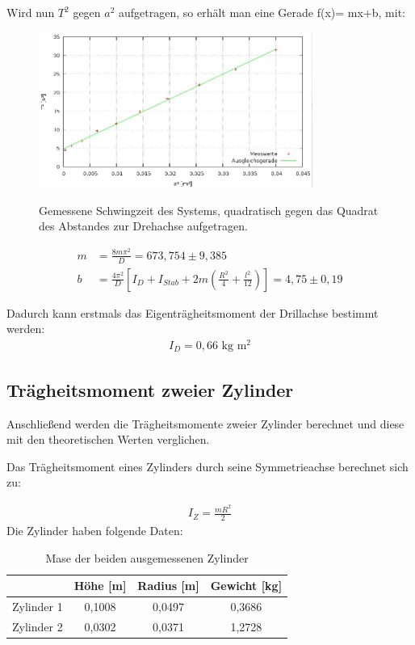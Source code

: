 Wird nun $T^2$ gegen $a^2$ aufgetragen, so erhält man eine Gerade f(x)= mx+b, mit:
\begin{figure}[htbp]
\includegraphics[width=0.8\textwidth]{pics/eigentr.jpg}
\label{pic_plot}
\caption{Gemessene Schwingzeit des Systems, quadratisch gegen das Quadrat des Abstandes zur Drehachse aufgetragen.}

\end{figure}
\begin{align*}
 m&=\frac{8m\pi^2}{D}=673,754 \pm 9,385\\
b&=\frac{4\pi^2}{D}  \left[  I_D+I_{Stab}+2m\left(\frac{R^2}{4}+\frac{l^2}{12}\right)\right]=4,75 \pm 0,19
\end{align*}

Dadurch kann erstmals das Eigenträgheitsmoment der Drillachse bestimmt werden:
\begin{align*}
I_D=0,66  \text{ kg m$^2$}
\end{align*}

\subsection{Trägheitsmoment zweier Zylinder}
Anschließend werden die Trägheitsmomente zweier Zylinder berechnet und diese mit den theoretischen Werten verglichen.

Das Trägheitsmoment eines Zylinders durch seine Symmetrieachse berechnet sich zu:

\begin{align}
I_{Z}=\frac{mR^2}{2}
\label{eq_Izyl}
\end{align}
\newpage
Die Zylinder haben folgende Daten:
\begin{table}[H]
\begin{tabular}{|c|c|c|c|}
\hline 
 & Höhe [m] & Radius [m] & Gewicht [kg]\\ 
\hline 
Zylinder 1 & 0,1008 & 0,0497 & 0,3686 \\ 
\hline 
Zylinder 2 & 0,0302 & 0,0371 & 1,2728 \\ 
\hline 
\end{tabular} 
\caption{Mase der beiden ausgemessenen Zylinder}
\end{table}

